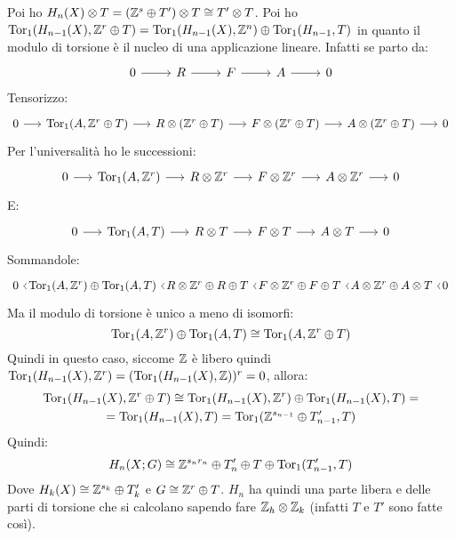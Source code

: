 \begin{osservation}
  Poi ho $ H_n(X) \otimes T = (\mathbb{Z}^s \oplus T') \otimes T \cong T' \otimes T $.
  Poi ho $ \mathrm{Tor_1}( H_{n-1}(X), \mathbb{Z}^r \oplus T) = \mathrm{Tor_1}( H_{n-1}(X), \mathbb{Z}^n) \oplus \mathrm{Tor_1}( H_{n-1}, T) $
  in quanto il modulo di torsione è il nucleo di una applicazione lineare.
  Infatti se parto da:
  \[
    \begin{tikzcd}
      0 \rar & R \rar & F \rar & A \rar & 0
    \end{tikzcd}
  \]
  Tensorizzo:
  \[
    \begin{tikzcd}[nodes = {column sep = 15pt}]
      0 \rar & \tor{A, \Z^r \oplus T} \rar & R \otimes (\Z^r \oplus T) \rar & F \otimes (\Z^r \oplus T)\rar & A \otimes (\Z^r \oplus T) \rar & 0
    \end{tikzcd}
  \]
  Per l'universalità ho le successioni:
  \[
    \begin{tikzcd}[nodes = {column sep = 15pt}]
      0 \rar & \tor{A, \Z^r } \rar & R \otimes \Z^r \rar & F \otimes \Z^r \rar & A \otimes \Z^r \rar & 0
    \end{tikzcd}
  \]
  E:
  \[
    \begin{tikzcd}[nodes = {column sep = 15pt}]
      0 \rar & \tor{A, T} \rar & R \otimes T \rar & F \otimes T \rar & A \otimes T \rar & 0
    \end{tikzcd}
  \]
  Sommandole:
  \[
    \begin{tikzcd}[nodes = {column sep = 0pt}]
      0 \rar & \tor{A, \Z^r} \oplus \tor{A, T} \rar & R \otimes \Z^r \oplus R \oplus T \rar & F \otimes \Z^r \oplus F \oplus T \rar & A \otimes \Z^r \oplus A \otimes T  \rar & 0
    \end{tikzcd}
  \]
  Ma il modulo di torsione è unico a meno di isomorfi:
  \[
     \mathrm{Tor_1}( A, \mathbb{Z}^r) \oplus \mathrm{Tor_1}( A, T) \cong \mathrm{Tor_1}( A, \mathbb{Z}^r \oplus T)
   \]
   Quindi in questo caso, siccome $ \mathbb{Z} $ è libero quindi
   $ \mathrm{Tor_1}( H_{n-1}(X), \mathbb{Z}^r) = (\mathrm{Tor_1}( H_{n-1}(X), \mathbb{Z}))^r = 0 $, allora:
   \begin{gather*}
     \mathrm{Tor_1}( H_{n-1}(X), \mathbb{Z}^r \oplus T) \cong \mathrm{Tor_1}( H_{n-1}(X), \mathbb{Z}^r) \oplus \mathrm{Tor_1}( H_{n-1}(X), T) = \\
     = \mathrm{Tor_1}( H_{n-1}(X), T) = \mathrm{Tor_1}( \mathbb{Z}^{s_{n-1}} \oplus T'_{n-1}, T)
   \end{gather*}
   Quindi:
   \[
     H_n(X; G) \cong \mathbb{Z}^{s_n r_n} \oplus T_n' \oplus T \oplus \mathrm{Tor_1}( T_{n-1}', T)
   \]
   Dove $ H_k(X) \cong \mathbb{Z}^{s_k} \oplus T_k' $ e $ G \cong \mathbb{Z}^r \oplus T $.
   $ H_n $ ha quindi una parte libera e delle parti di torsione che si calcolano
   sapendo fare $ \mathbb{Z}_h \otimes \mathbb{Z}_k $ (infatti $ T $ e $ T' $ sono fatte così).
 \end{osservation}

